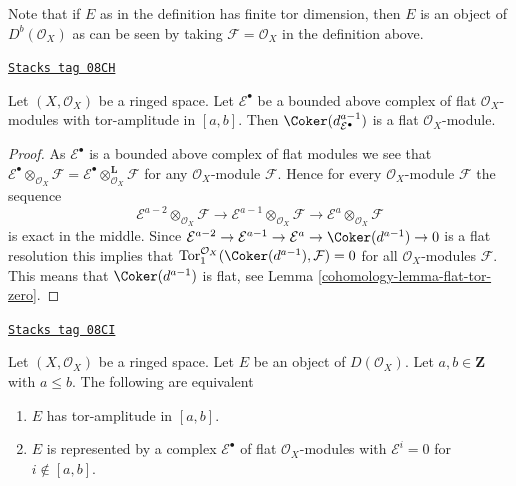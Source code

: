 Note that if $E$ as in the definition
has finite tor dimension, then $E$ is an object of
$D^b(\mathcal{O}_X)$ as can be seen by taking $\mathcal{F} = \mathcal{O}_X$
in the definition above.

\begin{lemma}
\label{cohomology-lemma-last-one-flat}
\href{https://stacks.math.columbia.edu/tag/08CH}{\texttt{Stacks tag 08CH}}

Let $(X, \mathcal{O}_X)$ be a ringed space.
Let $\mathcal{E}^\bullet$ be a bounded above complex of flat
$\mathcal{O}_X$-modules with tor-amplitude in $[a, b]$.
Then $\Coker(d_{\mathcal{E}^\bullet}^{a - 1})$ is a flat
$\mathcal{O}_X$-module.
\end{lemma}

\begin{proof}

As $\mathcal{E}^\bullet$ is a bounded above complex of flat modules we see that
$\mathcal{E}^\bullet \otimes_{\mathcal{O}_X} \mathcal{F} =
\mathcal{E}^\bullet \otimes_{\mathcal{O}_X}^{\mathbf{L}} \mathcal{F}$
for any $\mathcal{O}_X$-module $\mathcal{F}$.
Hence for every $\mathcal{O}_X$-module $\mathcal{F}$ the sequence
$$
\mathcal{E}^{a - 2} \otimes_{\mathcal{O}_X} \mathcal{F} \to
\mathcal{E}^{a - 1} \otimes_{\mathcal{O}_X} \mathcal{F} \to
\mathcal{E}^a \otimes_{\mathcal{O}_X} \mathcal{F}
$$
is exact in the middle. Since
$\mathcal{E}^{a - 2} \to \mathcal{E}^{a - 1} \to \mathcal{E}^a \to
\Coker(d^{a - 1}) \to 0$
is a flat resolution this implies that
$\text{Tor}_1^{\mathcal{O}_X}(\Coker(d^{a - 1}), \mathcal{F}) = 0$
for all $\mathcal{O}_X$-modules $\mathcal{F}$. This means that
$\Coker(d^{a - 1})$ is flat, see Lemma \ref{cohomology-lemma-flat-tor-zero}.
\end{proof}

\begin{lemma}
\label{cohomology-lemma-tor-amplitude}
\href{https://stacks.math.columbia.edu/tag/08CI}{\texttt{Stacks tag 08CI}}

Let $(X, \mathcal{O}_X)$ be a ringed space.
Let $E$ be an object of $D(\mathcal{O}_X)$.
Let $a, b \in \mathbf{Z}$ with $a \leq b$. The following are equivalent
\begin{enumerate}
\item $E$ has tor-amplitude in $[a, b]$.
\item $E$ is represented by a complex
$\mathcal{E}^\bullet$ of flat $\mathcal{O}_X$-modules with
$\mathcal{E}^i = 0$ for $i \not \in [a, b]$.
\end{enumerate}
\end{lemma}

